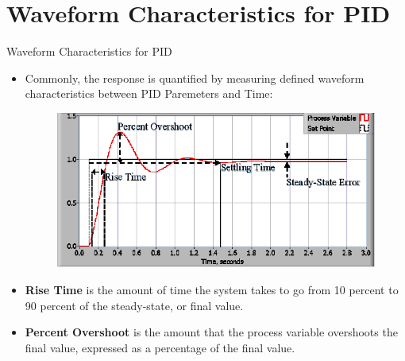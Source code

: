 \documentclass[10pt, a4paper]{beamer}
\begin{document}
		
	\section{Waveform Characteristics for PID}
		\begin{frame}{Waveform Characteristics for PID} 
			\begin{itemize}
				\item Commonly, the response is quantified by measuring defined waveform characteristics between PID Paremeters and Time:
					\begin{figure}
						\centering
						\includegraphics[scale = 0.5]{PID_Characteristic.png} \\
					\end{figure} 
				\item \textbf{Rise Time} is the amount of time the system takes 
				to go from 10 percent to 90 percent of the steady-state, or final value.
				\item \textbf{Percent Overshoot} is the amount 
				that the process variable overshoots the final value,
				expressed as a percentage of the final value.
			\end{itemize}	 
		\end{frame}
	
\end{document}
